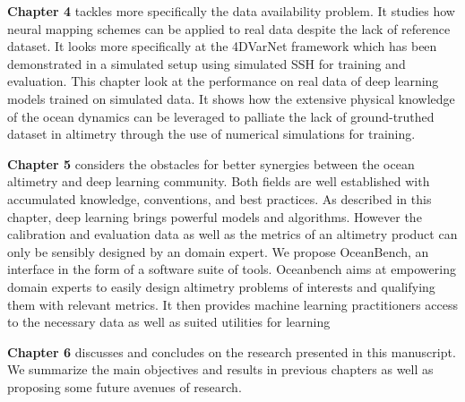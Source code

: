 \begin{bibunit}
\textbf{Chapter 4} tackles more specifically the data availability problem. It studies how neural mapping schemes can be applied to real data despite the lack of reference dataset.
It looks more specifically at the 4DVarNet framework which has been demonstrated in a simulated setup\cite{fabletENDTOENDPHYSICSINFORMEDREPRESENTATION2021} using simulated SSH for training and evaluation.
This chapter look at the performance on real data of deep learning models trained on simulated data.
It shows how the extensive physical knowledge of the ocean dynamics can be leveraged to palliate the lack of ground-truthed dataset in altimetry through the use of numerical simulations for training.

\textbf{Chapter 5} considers the obstacles for better synergies between the ocean altimetry and deep learning community.
Both fields are well established with accumulated knowledge, conventions, and best practices. 
As described in this chapter, deep learning brings powerful models and algorithms.
However the calibration and evaluation data as well as the metrics of an altimetry product can only be sensibly designed by an domain expert. 
We propose OceanBench, an interface in the form of a software suite of tools.
Oceanbench aims at empowering domain experts to easily design altimetry problems of interests and qualifying them with relevant metrics. 
It then provides machine learning practitioners access to the necessary data as well as suited utilities for learning

\textbf{Chapter 6} discusses and concludes on the research presented in this manuscript. We summarize the main objectives and results in previous chapters as well as proposing some future avenues of research.


\end{bibunit}

